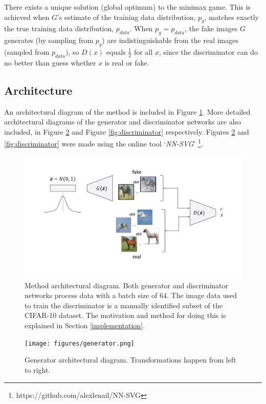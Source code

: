 \documentclass{article}
\begin{document}
There exists a unique solution (global optimum) to the minimax game. This is achieved when $G$'s estimate of the training data distribution, $p_g$, matches exactly the true training data distribution, $p_{data}$. When $p_g = p_{data}$, the fake images $G$ generates (by sampling from $p_g$) are indistinguishable from the real images (sampled from $p_{data}$), so $D(x)$ equals $\frac{1}{2}$ for all $x$, since the discriminator can do no better than guess whether $x$ is real or fake.

\subsection{Architecture}
An architectural diagram of the method is included in Figure \ref{fig:architecture}. More detailed architectural diagrams of the generator and discriminator networks are also included, in Figure \ref{fig:generator} and Figure \ref{fig:discriminator} respectively. Figures \ref{fig:generator} and \ref{fig:discriminator} were made using the online tool `\textit{NN-SVG}' \footnote{https://github.com/alexlenail/NN-SVG}.

\begin{figure}[h]
    \begin{center}
        \includegraphics[width=1\textwidth]{figures/architecture.pdf}
    \end{center}
    \caption{Method architectural diagram. Both generator and discriminator networks process data with a batch size of 64. The image data used to train the discriminator is a manually identified subset of the CIFAR-10 dataset. The motivation and method for doing this is explained in Section \ref{implementation}.}
    \label{fig:architecture}
\end{figure}

\begin{figure}[h]
    \begin{center}
        \texttt{[image: figures/generator.png]}
    \end{center}
    \caption{Generator architectural diagram. Transformations happen from left to right.}
    \label{fig:generator}
\end{figure}
\end{document}
